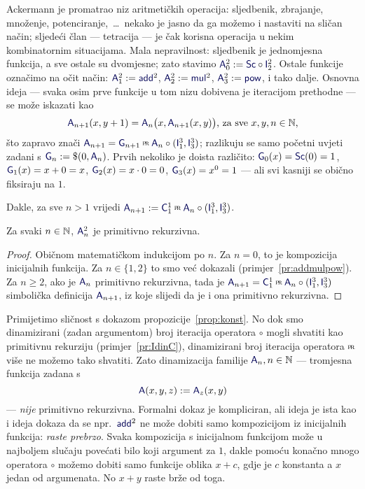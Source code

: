 Ackermann je promatrao niz aritmetičkih operacija: sljedbenik, zbrajanje, množenje, potenciranje,~\ldots\ nekako je jasno da ga možemo i nastaviti na sličan način; sljedeći član --- tetracija --- je čak korisna operacija u nekim kombinatornim situacijama. Mala nepravilnost: sljedbenik je jednomjesna funkcija, a sve ostale su dvomjesne; zato stavimo $\f A_0^2:=\f{Sc}\circ \f I_2^2$. Ostale funkcije označimo na očit način: $\f A_1^2:=\f{add}^2$, $\f A_2^2:=\f{mul}^2$, $\f A_3^2:=\f{pow}$, i tako dalje. Osnovna ideja --- svaka osim prve funkcije u tom nizu dobivena je iteracijom prethodne --- se može iskazati kao
\begin{equation}\label{eq:A2SSdef}
    \f A_{n+1}(x,y+1)=\f A_n\bigl(x,\f A_{n+1}(x,y)\bigr)\text{, za sve }x,y,n\in\N\text,
\end{equation}
što zapravo znači $\f A_{n+1}=\f G_{n+1}\pr\f A_n\circ(\f I_1^3,\f I_3^3)$; razlikuju se samo početni uvjeti zadani s $\f G_n:=\$(0,\f A_n)$. Prvih nekoliko je doista različito: $\f G_0(x)=\f{Sc}(0)=1$, $\f G_1(x)=x+0=x$, $\f G_2(x)=x\cdot 0=0$, $\f G_3(x)=x^0=1$ --- ali svi kasniji se obično fiksiraju na $1$.

Dakle, za sve $n>1$ vrijedi $\f A_{n+1}:=\f C_1^1\pr\f A_n\circ(\f I_1^3,\f I_3^3)$.

\begin{propozicija}[{name=[primitivna rekurzivnost generaliziranih aritmetičkih operacija]}]\label{pp:Anprn}
    Za svaki $n\in{\mathbb N}$, $\f A_n^2$ je primitivno rekurzivna.
\end{propozicija}
\begin{proof}
Običnom matematičkom indukcijom po $n$. Za $n=0$, to je kompozicija inicijalnih funkcija. Za $n\in\{1,2\}$ to smo već dokazali (primjer~\ref{pr:addmulpow}). Za $n\ge 2$, ako je $\f A_n$ primitivno rekurzivna, tada je $\f A_{n+1}=\f C_1^1\pr\f A_n\circ(\f I_1^3,\f I_3^3)$ simbolička definicija $\f A_{n+1}$, iz koje slijedi da je i ona primitivno rekurzivna.
\end{proof}

Primijetimo sličnost s dokazom propozicije~\ref{prop:konst}. No dok smo dinamizirani (zadan argumentom) broj iteracija operatora $\circ$ mogli shvatiti kao primitivnu rekurziju (primjer~\ref{pr:IdinC}), dinamizirani broj iteracija operatora $\pr$ više ne možemo tako shvatiti. Zato dinamizacija familije $\f A_n,n\in\N$ --- tromjesna funkcija zadana s
\begin{equation}
    \f A(x,y,z):=\f A_z(x,y)%
\end{equation}
{} --- \emph{nije} primitivno rekurzivna. Formalni dokaz je kompliciran, ali ideja je ista kao i ideja dokaza da se npr.\ $\f{add}^2$ ne može dobiti samo kompozicijom iz inicijalnih funkcija: \emph{raste prebrzo}. Svaka kompozicija s inicijalnom funkcijom može u najboljem slučaju povećati bilo koji argument za $1$, dakle pomoću konačno mnogo operatora $\circ$ možemo dobiti samo funkcije oblika $x+c$, gdje je $c$ konstanta a $x$ jedan od argumenata. No $x+y$ raste brže od toga.

